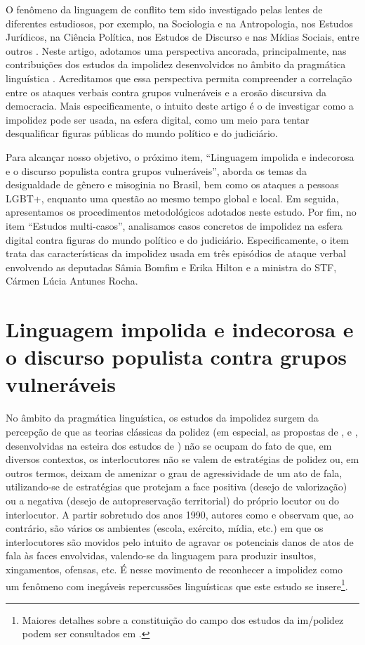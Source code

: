 \documentclass[portuguese]{textolivre}
\begin{document}
O fenômeno da linguagem de conflito tem sido investigado pelas lentes de diferentes estudiosos, por exemplo, na Sociologia e na Antropologia, nos Estudos Jurídicos, na Ciência Política, nos Estudos de Discurso e nas Mídias Sociais, entre outros \cite{oliveira2024}. Neste artigo, adotamos uma perspectiva ancorada, principalmente, nas contribuições dos estudos da impolidez desenvolvidos no âmbito da pragmática linguística \cite{culpeper2010, culpeper2011}. Acreditamos que essa perspectiva permita compreender a correlação entre os ataques verbais contra grupos vulneráveis e a erosão discursiva da democracia. Mais especificamente, o intuito deste artigo é o de investigar como a impolidez pode ser usada, na esfera digital, como um meio para tentar desqualificar figuras públicas do mundo político e do judiciário.

Para alcançar nosso objetivo, o próximo item, “Linguagem impolida e indecorosa e o discurso populista contra grupos vulneráveis”, aborda os temas da desigualdade de gênero e misoginia no Brasil, bem como os ataques a pessoas LGBT+, enquanto uma questão ao mesmo tempo global e local. Em seguida, apresentamos os procedimentos metodológicos adotados neste estudo. Por fim, no item “Estudos multi-casos”, analisamos casos concretos de impolidez na esfera digital contra figuras do mundo político e do judiciário. Especificamente, o item trata das características da impolidez usada em três episódios de ataque verbal envolvendo as deputadas Sâmia Bomfim e Erika Hilton e a ministra do STF, Cármen Lúcia Antunes Rocha.

\section{Linguagem impolida e indecorosa e o discurso populista contra grupos vulneráveis}\label{sec-1}
No âmbito da pragmática linguística, os estudos da impolidez surgem da percepção de que as teorias clássicas da polidez (em especial, as propostas de \textcite{brown1987}, \textcite{leech1983} e \textcite{lakoff1975}, desenvolvidas na esteira dos estudos de \textcite{goffman1967}) não se ocupam do fato de que, em diversos contextos, os interlocutores não se valem de estratégias de polidez ou, em outros termos, deixam de amenizar o grau de agressividade de um ato de fala, utilizando-se de estratégias que protejam a face positiva (desejo de valorização) ou a negativa (desejo de autopreservação territorial) do próprio locutor ou do interlocutor. A partir sobretudo dos anos 1990, autores como \textcite{culpeper2011} e \textcite{bousfield2007} observam que, ao contrário, são vários os ambientes (escola, exército, mídia, etc.) em que os interlocutores são movidos pelo intuito de agravar os potenciais danos de atos de fala às faces envolvidas, valendo-se da linguagem para produzir insultos, xingamentos, ofensas, etc. É nesse movimento de reconhecer a impolidez como um fenômeno com inegáveis repercussões linguísticas que este estudo se insere\footnote{Maiores detalhes sobre a constituição do campo dos estudos da im/polidez podem ser consultados em \textcite{cunha2020}.}.
\end{document}
